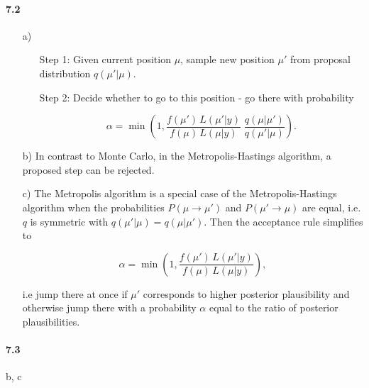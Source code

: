 \documentclass[fontsize=11pt,DIV=18,parskip=half]{scrartcl}
\begin{document}
\paragraph{7.2}
\begin{enumerate}
\item[a)] \mbox{}

\begin{enumerate}
\item[Step 1:] Given current position $\mu$, sample new position $\mu'$ from proposal distribution $q(\mu'|\mu)$.
\item[Step 2:] Decide whether to go to this position - go there with probability


\begin{equation*}
\alpha = \min\left(1, \frac{f(\mu') \, L(\mu'|y)}{f(\mu) \, L(\mu|y) } \; \frac{q(\mu|\mu')}{q(\mu'|\mu)} \right).
\end{equation*}

\end{enumerate}

\item[b)] In contrast to Monte Carlo, in the Metropolis-Hastings algorithm, a proposed step can be rejected.

\item[c)] The Metropolis algorithm is a special case of the Metropolis-Hastings algorithm when the probabilities $P(\mu \to \mu')$ and $P(\mu' \to \mu)$ are equal, i.e. $q$ is symmetric with $q(\mu'|\mu) = q(\mu|\mu')$. Then the acceptance rule simplifies to

\begin{equation*}
\alpha = \min\left(1, \frac{f(\mu') \, L(\mu'|y)}{f(\mu) \, L(\mu|y) } \right),
\end{equation*}

i.e jump there at once if $\mu'$ corresponds to higher posterior plausibility and otherwise jump there with a probability $\alpha$ equal to the ratio of posterior plausibilities.

\end{enumerate}


\paragraph{7.3} b, c
\end{document}
